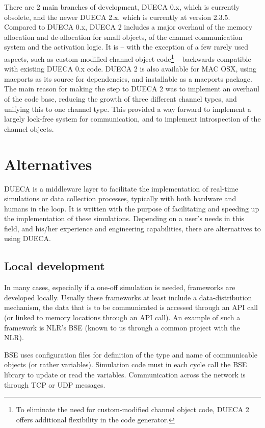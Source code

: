\documentclass[11pt,a4paper,twoside]{scrreprt}
\begin{document}
There are 2 main branches of development, DUECA 0.x, which is currently obsolete, and the newer DUECA 2.x, which is currently at version 2.3.5. Compared to DUECA 0.x, DUECA 2 includes a major overhaul of the memory allocation and de-allocation for small objects, of the channel communication system and the activation logic. It is -- with the exception of a few rarely used aspects, such as custom-modified channel object code\footnote{To eliminate the need for custom-modified channel object code, DUECA 2 offers additional flexibility in the code generator.} -- backwards compatible with existing DUECA 0.x code. DUECA 2 is also available for MAC OSX, using macports as its source for dependencies, and installable as a macports package. The main reason for making the step to DUECA 2 was to implement an overhaul of the code base, reducing the growth of three different channel types, and unifying this to one channel type. This provided a way forward to implement a largely lock-free system for communication, and to implement introspection of the channel objects.

\chapter{Alternatives}

DUECA is a middleware layer to facilitate the implementation of real-time simulations or data collection processes, typically with both hardware and humans in the loop. It is written with the purpose of facilitating and speeding up the implementation of these simulations. Depending on a user's needs in this field, and his/her experience and engineering capabilities, there are alternatives to using DUECA.

\section{Local development}

In many cases, especially if a one-off simulation is needed,
frameworks are developed locally. Usually these frameworks at least include a data-distribution mechanism, the data that is to be communicated is accessed through an API call (or linked to memory locations through an API call). An example of such a framework is NLR's BSE (known to us through a common project with the NLR).

BSE uses configuration files for definition of the type and name of communicable objects (or rather variables). Simulation code must in each cycle call the BSE library to update or read the variables. Communication across the network is through TCP or UDP messages.
\end{document}
